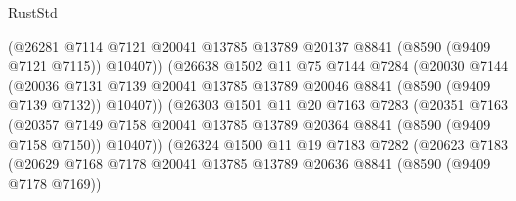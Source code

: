 \begin{lexlean}{RustStd}
\begin{coremodule}
                              (@26281
                                @7114
                                @7121
                                @20041
                                @13785
                                @13789
                                @20137
                                @8841
                                (@8590 (@9409 @7121 @7115))
                                @10407))
                            (@26638
                              @1502
                              @11
                              @75
                              @7144
                              @7284
                              (@20030
                                @7144
                                (@20036
                                  @7131
                                  @7139
                                  @20041
                                  @13785
                                  @13789
                                  @20046
                                  @8841
                                  (@8590 (@9409 @7139 @7132))
                                  @10407))
                              (@26303
                                @1501
                                @11
                                @20
                                @7163
                                @7283
                                (@20351
                                  @7163
                                  (@20357
                                    @7149
                                    @7158
                                    @20041
                                    @13785
                                    @13789
                                    @20364
                                    @8841
                                    (@8590 (@9409 @7158 @7150))
                                    @10407))
                                (@26324
                                  @1500
                                  @11
                                  @19
                                  @7183
                                  @7282
                                  (@20623
                                    @7183
                                    (@20629
                                      @7168
                                      @7178
                                      @20041
                                      @13785
                                      @13789
                                      @20636
                                      @8841
                                      (@8590 (@9409 @7178 @7169))

\end{coremodule}
\end{lexlean}
